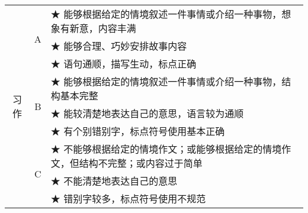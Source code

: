 \begin{table}[H]
\begin{tabularx}{\textwidth}{|c|c|X|}
\hline
   \multirow{9}{*}{习作}  & \multirow{3}{*}{A}  & ★	能够根据给定的情境叙述一件事情或介绍一种事物，想象有新意，内容丰满  \\  
   & &  ★	能够合理、巧妙安排故事内容 \\    
   & &  ★	语句通顺，描写生动，标点正确 \\    
\cline{2-3}      

   &   \multirow{3}{*}{B}  &  ★	能够根据给定的情境叙述一件事情或介绍一种事物，结构基本完整 \\  
   & & ★	能较清楚地表达自己的意思，语言较为通顺 \\  
   & &  ★	有个别错别字，标点符号使用基本正确 \\    
\cline{2-3}

   &   \multirow{3}{*}{C}  & ★	不能够根据给定的情境作文；或能够根据给定的情境作文，但结构不完整；或内容过于简单 \\  
   & &  ★	不能清楚地表达自己的意思 \\  
   & &  ★	错别字较多，标点符号使用不规范 \\ 
   
\hline 
\end{tabularx}
\end{table}
